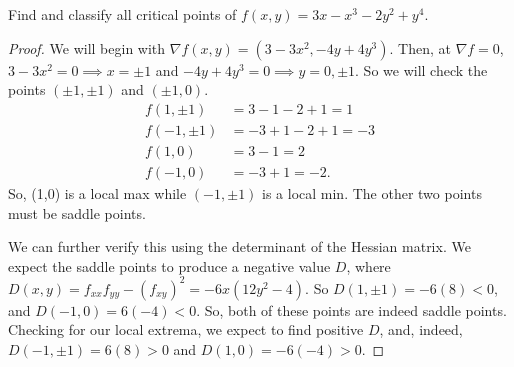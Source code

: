 \documentclass[../hw5]{subfiles}
\begin{document}
\begin{problem}[1]
Find and classify all critical points of $f(x,y)=3x - x^3 - 2y^2 + y^{4}$.
\end{problem}
\begin{proof}
	We will begin with $\nabla f(x,y)=(3 - 3x^2, -4y + 4y^3)$.
	Then, at $\nabla f = 0$, $3 - 3x^2=0\implies x=\pm 1$ and $-4y + 4y^3=0 \implies y=0, \pm 1$.
	So we will check the points $( \pm 1, \pm 1)$ and $( \pm 1, 0)$.
	\begin{align*}
		f(1, \pm 1)   & = 3-1-2+1   = 1  \\
		f(-1,  \pm 1) & = -3+1-2+1 = -3  \\
		f(1,0)        & = 3-1       = 2  \\
		f(-1,0)       & = -3 + 1    = -2
		.\end{align*}
	So, (1,0) is a local max while $(-1, \pm 1)$ is a local min. The other two points must be saddle points.

	We can further verify this using the determinant of the Hessian matrix.
	We expect the saddle points to produce a negative value $D$, where
	$D(x,y)=f_{xx}f_{yy}-{(f_{xy})}^2=-6x(12y^2 - 4)$.
	So $D(1, \pm 1) = -6(8) < 0$, and $D(-1,0) = 6(-4)<0$. So, both of these points are indeed saddle points.
	Checking for our local extrema, we expect to find positive $D$, and, indeed, $D(-1, \pm 1)= 6(8) > 0$ and $D(1,0) = -6(-4) > 0$.
\end{proof}
\end{document}
